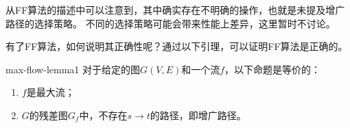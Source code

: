 	\par 从FF算法的描述中可以注意到，其中确实存在不明确的操作，也就是未提及增广路径的选择策略。
	不同的选择策略可能会带来性能上差异，这里暂时不讨论。

	\par 有了FF算法，如何说明其正确性呢？通过以下引理，可以证明FF算法是正确的。

\begin{lemma}{}{max-flow-lemma1}
	对于给定的图\(G(V,E)\)和一个流\(f\)，以下命题是等价的：
	\begin{enumerate}[(1)]
		\item \(f\)是最大流；
		\item \(G\)的残差图\(G_f\)中，不存在\(s \to t\)的路径，即增广路径。
	\end{enumerate}
\end{lemma}

